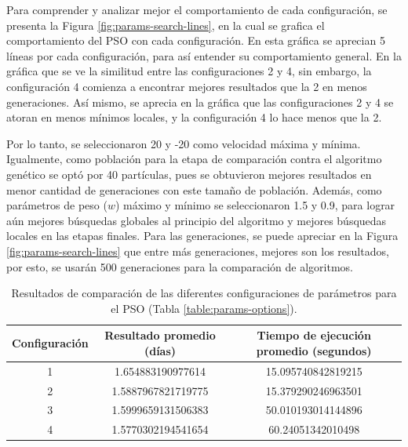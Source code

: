 \documentclass[letterpaper]{report}
\begin{document}
    Para comprender y analizar mejor el comportamiento de cada configuración,
    se presenta la Figura \ref{fig:params-search-lines}, en la cual se grafica
    el comportamiento del PSO con cada configuración. En esta gráfica se
    aprecian 5 líneas por cada configuración, para así entender su
    comportamiento general. En la gráfica que se ve la similitud entre las
    configuraciones 2 y 4, sin embargo, la configuración 4 comienza a encontrar
    mejores resultados que la 2 en menos generaciones. Así mismo, se aprecia en
    la gráfica que las configuraciones 2 y 4 se atoran en menos mínimos locales,
    y la configuración 4 lo hace menos que la 2.

    Por lo tanto, se seleccionaron 20 y -20 como velocidad máxima y mínima.
    Igualmente, como población para la etapa de comparación contra el algoritmo
    genético se optó por 40 partículas, pues se obtuvieron mejores resultados en
    menor cantidad de generaciones con este tamaño de población. Además, como
    parámetros de peso ($w$) máximo y mínimo se seleccionaron 1.5 y 0.9, para
    lograr aún mejores búsquedas globales al principio del algoritmo y mejores
    búsquedas locales en las etapas finales. Para las generaciones, se puede
    apreciar en la Figura \ref{fig:params-search-lines} que entre más
    generaciones, mejores son los resultados, por esto, se usarán 500
    generaciones para la comparación de algoritmos.
    
    \begin{table}[ht!]
      \caption{
        Resultados de comparación de las diferentes configuraciones de
        parámetros para el PSO (Tabla \ref{table:params-options}).
      }
      \begin{center}
        \begin{tabular}{|c|c|c|}
          \hline
          Configuración & Resultado promedio (días) & Tiempo de ejecución
            promedio (segundos) \\
          \hline
          1 & 1.654883190977614 & 15.095740842819215 \\
          \hline
          2 & 1.5887967821719775 & 15.379290246963501 \\
          \hline
          3 & 1.5999659131506383 & 50.010193014144896 \\
          \hline
          \rowcolor[HTML]{CCEEBB}
          4 & 1.5770302194541654 & 60.24051342010498 \\
          \hline
        \end{tabular}
        \label{table:params-results}
      \end{center}
    \end{table}
\end{document}
